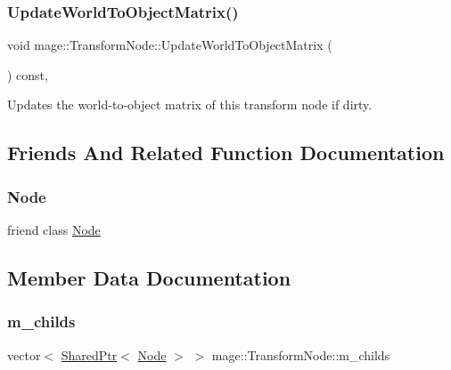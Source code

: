 \subsubsection{\texorpdfstring{Update\+World\+To\+Object\+Matrix()}{UpdateWorldToObjectMatrix()}}
{\footnotesize\ttfamily void mage\+::\+Transform\+Node\+::\+Update\+World\+To\+Object\+Matrix (\begin{DoxyParamCaption}{ }\end{DoxyParamCaption}) const\hspace{0.3cm}{\ttfamily [private]}, {\ttfamily [noexcept]}}

Updates the world-\/to-\/object matrix of this transform node if dirty. 

\subsection{Friends And Related Function Documentation}
\hypertarget{structmage_1_1_transform_node_a6db9d28bd448a131448276ee03de1e6d}{}\label{structmage_1_1_transform_node_a6db9d28bd448a131448276ee03de1e6d} 
\subsubsection{\texorpdfstring{Node}{Node}}
{\footnotesize\ttfamily friend class \hyperlink{classmage_1_1_node}{Node}\hspace{0.3cm}{\ttfamily [friend]}}



\subsection{Member Data Documentation}
\hypertarget{structmage_1_1_transform_node_ae26b5d4c920a3743354b6f28c8b41651}{}\label{structmage_1_1_transform_node_ae26b5d4c920a3743354b6f28c8b41651} 
\subsubsection{\texorpdfstring{m\+\_\+childs}{m\_childs}}
{\footnotesize\ttfamily vector$<$ \hyperlink{namespacemage_a1e01ae66713838a7a67d30e44c67703e}{Shared\+Ptr}$<$ \hyperlink{classmage_1_1_node}{Node} $>$ $>$ mage\+::\+Transform\+Node\+::m\+\_\+childs\hspace{0.3cm}{\ttfamily [private]}}

